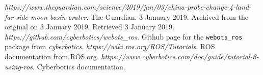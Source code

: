 \documentclass[a4paper]{article}
\begin{document}
	
	\newpage
	
	\begin{thebibliography}{9}
		\textit{https://www.theguardian.com/science/2019/jan/03/china-probe-change-4-land-far-side-moon-basin-crater}. \newline
		The Guardian. 3 January 2019. Archived from the original on 3 January 2019. Retrieved 3 January 2019.
		\textit{https://github.com/cyberbotics/webots\_ros}. \newline
		Github page for the \texttt{webots\_ros} package from \textit{cyberbotics}.
		\textit{https://wiki.ros.org/ROS/Tutorials}. \newline
		ROS documentation from ROS.org.
		\textit{https://www.cyberbotics.com/doc/guide/tutorial-8-using-ros}. \newline
		Cyberbotics documentation.
	\end{thebibliography}
\end{document}
